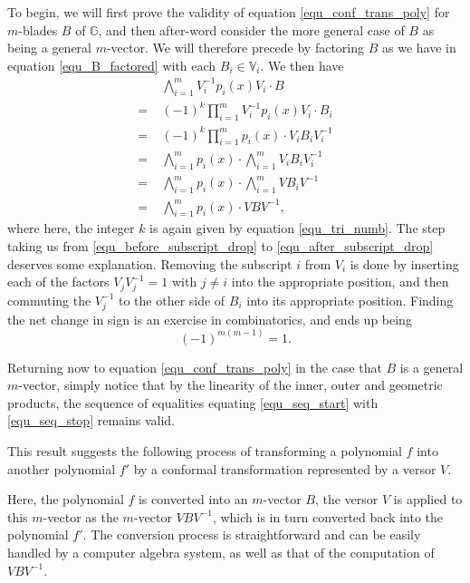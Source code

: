 \documentclass{birkjour}
\theoremstyle{definition}
\theoremstyle{remark}
\numberwithin{equation}{section}
\newcommand{\G}{\mathbb{G}}
\newcommand{\V}{\mathbb{V}}
\begin{document}
To begin, we will first prove the validity of equation \eqref{equ_conf_trans_poly} for $m$-blades $B$ of $\G$,
and then after-word consider the more general case of $B$ as being a general $m$-vector.
We will therefore precede by factoring $B$ as we have in equation \eqref{equ_B_factored}
with each $B_i\in\V_i$.  We then have
\begin{align}
 & \bigwedge_{i=1}^m V_i^{-1}p_i(x)V_i\cdot B\label{equ_seq_start} \\
=\;& (-1)^k\prod_{i=1}^m V_i^{-1}p_i(x)V_i\cdot B_i\nonumber \\
=\;& (-1)^k\prod_{i=1}^m p_i(x)\cdot V_iB_iV_i^{-1}\nonumber \\
=\;&\bigwedge_{i=1}^m p_i(x)\cdot\bigwedge_{i=1}^m V_iB_iV_i^{-1}\label{equ_before_subscript_drop} \\
=\;&\bigwedge_{i=1}^m p_i(x)\cdot\bigwedge_{i=1}^m VB_iV^{-1}\label{equ_after_subscript_drop} \\
=\;&\bigwedge_{i=1}^m p_i(x)\cdot VBV^{-1},\label{equ_seq_stop}
\end{align}
where here, the integer $k$ is again given by equation \eqref{equ_tri_numb}.  The step taking us from
\eqref{equ_before_subscript_drop} to \eqref{equ_after_subscript_drop} deserves some explanation.
Removing the subscript $i$ from $V_i$ is done by inserting each of the factors $V_jV_j^{-1}=1$ with $j\neq i$
into the appropriate position, and then
commuting the $V_j^{-1}$ to the other side of $B_i$ into its appropriate position.  Finding the net change in sign
is an exercise in combinatorics, and ends up being
\begin{equation*}
(-1)^{m(m-1)}=1.
\end{equation*}

Returning now to equation \eqref{equ_conf_trans_poly} in the case that $B$ is a general $m$-vector, simply notice
that by the linearity of the inner, outer and
geometric products, the sequence of equalities equating \eqref{equ_seq_start} with \eqref{equ_seq_stop} remains valid.

This result suggests the following process of transforming a polynomial $f$ into another polynomial $f'$ by a conformal
transformation represented by a versor $V$.
\begin{center}
\end{center}
Here, the polynomial $f$ is converted into an $m$-vector $B$, the versor $V$ is applied to this $m$-vector
as the $m$-vector $VBV^{-1}$, which is in turn converted back into the polynomial $f'$.  The conversion
process is straightforward and can be easily handled by a computer algebra system, as well as that
of the computation of $VBV^{-1}$.
\end{document}
